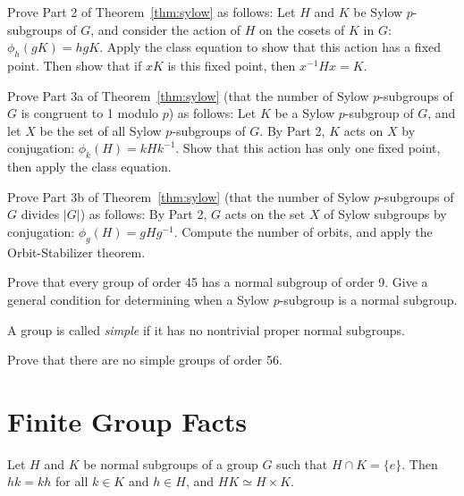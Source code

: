 \begin{problem}
Prove Part 2 of Theorem~\ref{thm:sylow} as follows: Let $H$ and $K$ be Sylow $p$-subgroups of $G$, and consider the action of $H$ on the cosets of $K$ in $G$: $\phi_h(gK)=hgK$. Apply the class equation to show that this action has a fixed point. Then show that if $xK$ is this fixed point, then $x^{-1}Hx=K$.
\end{problem}



\begin{problem}
Prove Part 3a of Theorem~\ref{thm:sylow} (that the number of Sylow $p$-subgroups of $G$ is congruent to 1 modulo $p$) as follows: Let $K$ be a Sylow $p$-subgroup of $G$, and let $X$ be the set of all Sylow $p$-subgroups of $G$. By Part 2, $K$ acts on $X$ by conjugation: $\phi_k(H) = kHk^{-1}$. Show that this action has only one fixed point, then apply the class equation.
\end{problem}



\begin{problem}
Prove Part 3b of Theorem~\ref{thm:sylow} (that the number of Sylow $p$-subgroups of $G$ divides $|G|$) as follows: By Part 2, $G$ acts on the set $X$ of Sylow subgroups by conjugation: $\phi_g(H)=gHg^{-1}$. Compute the number of orbits, and apply the Orbit-Stabilizer theorem.
\end{problem}



\begin{problem}
Prove that every group of order 45 has a normal subgroup of order 9. Give a general condition for determining when a Sylow $p$-subgroup is a normal subgroup.
\end{problem}



\begin{definition}
 A group is called \emph{simple} if it has no nontrivial proper normal subgroups.
\end{definition}

\begin{problem}
Prove that there are no simple groups of order 56.
\end{problem}

\section{Finite Group Facts}

\begin{lemma}
 Let $H$ and $K$ be normal subgroups of a group $G$ such that $H\cap K = \{e\}$. Then $hk = kh$ for all $k\in K$ and $h\in H$, and $HK \simeq H\times K$.
\end{lemma}

